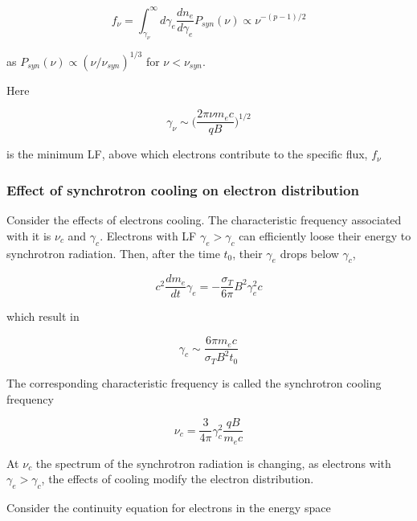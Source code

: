 \begin{equation}
f_{\nu} = \int_{\gamma_{\nu}}^{\infty} d\gamma_e \frac{dn_e}{d\gamma_e}P_{syn}(\nu) \propto \nu^{-(p-1)/2}
\end{equation}

as $P_{syn}(\nu) \propto (\nu/\nu_{syn})^{1/3}$ for $\nu < \nu_{syn}$.

Here

\begin{equation}
\gamma_{\nu} \sim \Bigg(\frac{2\pi\nu m_e c}{qB}\Bigg)^{1/2}
\end{equation}

is the minimum \ac{LF}, above which electrons contribute to the specific flux, $f_{\nu}$



\subsubsection{Effect of synchrotron cooling on electron distribution}

Consider the effects of electrons cooling. 
The characteristic frequency associated with it is $\nu_c$ and  $\gamma_c$.
Electrons with \ac{LF} $\gamma_e > \gamma_c$ can efficiently loose their energy to synchrotron radiation. Then, after the time $t_0$, their $\gamma_e$ drops below $\gamma_c$, 

\begin{equation}
c^2 \frac{dm_e}{dt} \gamma_e = -\frac{\sigma_T}{6\pi} B^2 \gamma_e^2 c
\end{equation}

which result in 

\begin{equation}
\gamma_c \sim \frac{6 \pi m_e c}{\sigma_T B^2 t_0}
\end{equation}

The corresponding characteristic frequency is called the synchrotron cooling frequency

\begin{equation}
\nu_c = \frac{3}{4\pi} \gamma_c^2 \frac{q B}{m_e c}
\end{equation}

At $\nu_c$ the spectrum of the synchrotron radiation is changing, as electrons with $\gamma_e > \gamma_c$, the effects of cooling modify the electron distribution. 

Consider the continuity equation for electrons in the energy space 


